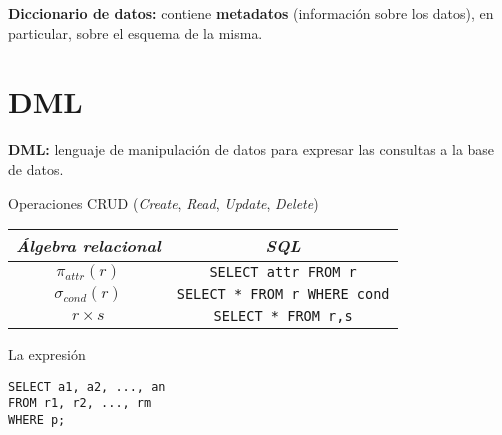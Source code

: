 \documentclass[a4paper, twoside]{article}
\begin{document}
\textbf{Diccionario de datos:} contiene \textbf{metadatos} (información sobre los datos), en particular, sobre el esquema de la misma.

\section{DML}
\textbf{DML:} lenguaje de manipulación de datos para expresar las consultas a la base de datos.

Operaciones CRUD (\emph{Create}, \emph{Read}, \emph{Update}, \emph{Delete})

\begin{center}
	\begin{tabular}{|c|c|}
		\hline 
		\emph{Álgebra relacional} & \emph{SQL}\\
		\hline 
		\hline 
		$\pi_{attr}(r)$ & \texttt{SELECT attr FROM r}\\
		\hline 
		$\sigma_{cond}(r)$ & \texttt{SELECT {*} FROM r WHERE cond}\\
		\hline 
		$r\times s$ & \texttt{SELECT {*} FROM r,s}\\
		\hline 
	\end{tabular}
\end{center}

La expresión

\begin{lstlisting}
SELECT a1, a2, ..., an
FROM r1, r2, ..., rm
WHERE p;
\end{lstlisting}
\end{document}
